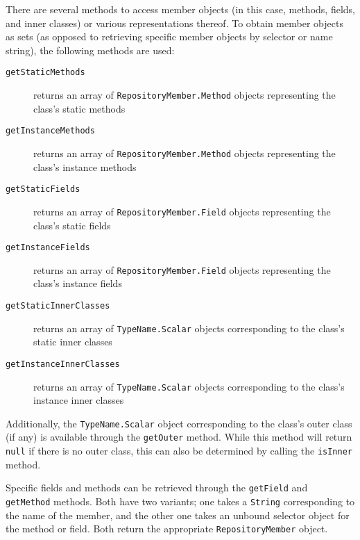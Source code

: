 \documentclass{report}
\begin{document}
There are several methods to access member objects (in this case, methods, 
fields, and inner classes) or various representations thereof. To 
obtain member objects as sets (as opposed to retrieving specific member objects
by selector or name string), the following methods are used:
\begin{description}

	\item[\texttt{getStaticMethods}] returns an array of 
	\texttt{Re\-pos\-i\-tory\-Mem\-ber.Me\-thod} objects representing the 
	class's static methods

	\item[\texttt{getInstanceMethods}] returns an array of 
	\texttt{Re\-pos\-i\-tory\-Mem\-ber.Me\-thod} objects representing the 
	class's instance methods

	\item[\texttt{getStaticFields}] returns an array of 
	\texttt{Re\-pos\-i\-tory\-Mem\-ber.Field} objects representing the 
	class's	static fields

	\item[\texttt{getInstanceFields}] returns an array of 
	\texttt{Re\-pos\-i\-tory\-Mem\-ber.Field} objects representing the 
	class's	instance fields

	\item[\texttt{getStaticInnerClasses}] returns an array of 
	\texttt{TypeName.Scalar} objects corresponding to the
	class's static inner classes

	\item[\texttt{getInstanceInnerClasses}] returns an array of 
	\texttt{TypeName.Scalar} objects corresponding to the
	class's instance inner classes

\end{description}

\noindent Additionally, the \texttt{TypeName.Scalar} object corresponding to 
the class's outer class (if any) is available through the \texttt{getOuter}
method. While this method will return \texttt{null} if there is no
outer class, this can also be determined by calling the \texttt{isInner}
method.

Specific fields and methods can be retrieved through the \texttt{getField}
and \texttt{getMethod} methods. Both have two variants; one takes a
\texttt{String} corresponding to the %
name of the member, and the other one takes an unbound selector
object for the method or field. Both return the appropriate 
\texttt{Re\-pos\-i\-tory\-Mem\-ber} object.
\end{document}

